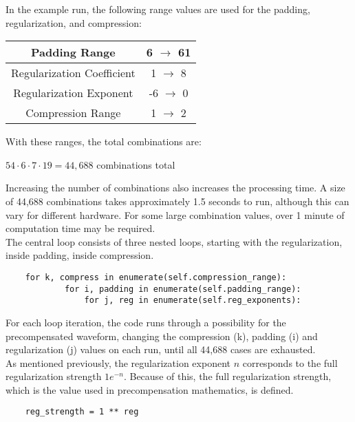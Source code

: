 In the example run, the following range values are used for the padding, regularization, and compression:

\begin{center}
\begin{tabular}{ | c | c | } 
  \hline
   Padding Range & 6 $\rightarrow$ 61 \\ 
  \hline
  Regularization Coefficient & 1 $\rightarrow$ 8 \\ 
  \hline
  Regularization Exponent & -6 $\rightarrow$ 0 \\ 
  \hline
  Compression Range & 1 $\rightarrow$ 2 \\ 
  \hline
\end{tabular}
\end{center}

With these ranges, the total combinations are:

\begin{center}
    $54 \cdot 6 \cdot 7 \cdot 19 = 44,688$ combinations total
\end{center}

Increasing the number of combinations also increases the processing time. A size of 44,688 combinations takes approximately 1.5 seconds to run, although this can vary for different hardware. For some large combination values, over 1 minute of computation time may be required.
\\
The central loop consists of three nested loops, starting with the regularization, inside padding, inside compression.

\begin{verbatim}
    for k, compress in enumerate(self.compression_range):
            for i, padding in enumerate(self.padding_range):
                for j, reg in enumerate(self.reg_exponents):
\end{verbatim}

For each loop iteration, the code runs through a possibility for the precompensated waveform, changing the compression (k), padding (i) and regularization (j) values on each run, until all 44,688 cases are exhausted.
\\
As mentioned previously, the regularization exponent $n$ corresponds to the full regularization strength $1e^{-n}$. Because of this, the full regularization strength, which is the value used in precompensation mathematics, is defined.

\begin{verbatim}
    reg_strength = 1 ** reg
\end{verbatim}

